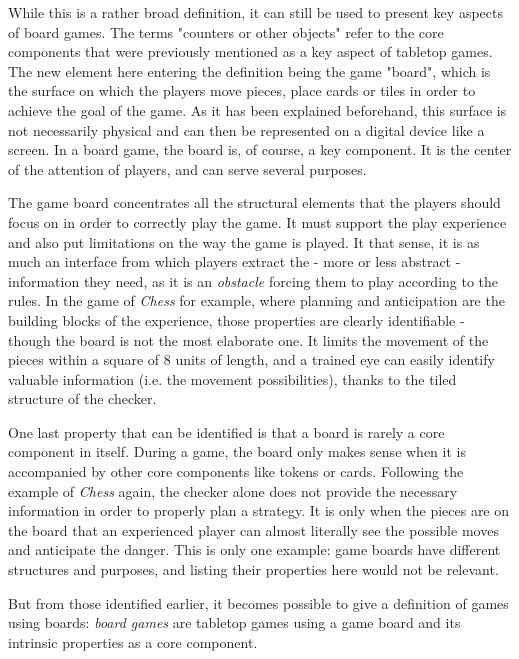 While this is a rather broad definition, it can still be used to present key aspects of board games. The terms "counters or other objects" refer to the core components that were previously mentioned as a key aspect of tabletop games. The new element here entering the definition being the game "board", which is the surface on which the players move pieces, place cards or tiles in order to achieve the goal of the game. As it has been explained beforehand, this surface is not necessarily physical and can then be represented on a digital device like a screen. In a board game, the board is, of course, a key component. It is the center of the attention of players, and can serve several purposes.

The game board concentrates all the structural elements that the players should focus on in order to correctly play the game. It must support the play experience and also put limitations on the way the game is played. It that sense, it is as much an interface from which players extract the - more or less abstract - information they need, as it is an \textit{obstacle} forcing them to play according to the rules. 
In the game of \textit{Chess} for example, where planning and anticipation are the building blocks of the experience, those properties are clearly identifiable - though the board is not the most elaborate one. It limits the movement of the pieces within a square of 8 units of length, and a trained eye can easily identify valuable information (i.e. the movement possibilities), thanks to the tiled structure of the checker. 

One last property that can be identified is that a board is rarely a core component in itself. During a game, the board only makes sense when it is accompanied by other core components like tokens or cards. Following the example of \textit{Chess} again, the checker alone does not provide the necessary information in order to properly plan a strategy. It is only when the pieces are on the board that an experienced player can almost literally see the possible moves and anticipate the danger. 
This is only one example: game boards have different structures and purposes, and listing their properties here would not be relevant. 

But from those identified earlier, it becomes possible to give a definition of games using boards: \textit{board games} are tabletop games using a game board and its intrinsic properties as a core component.

